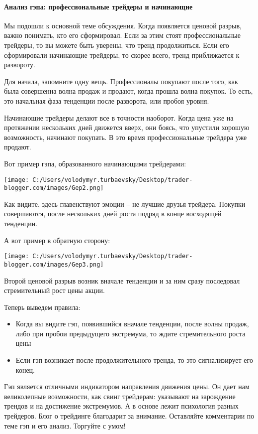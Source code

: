 \documentclass[a5paper]{article}
\begin{document}
\paragraph{Анализ гэпа: профессиональные трейдеры и начинающие}

Мы подошли к основной теме обсуждения. Когда появляется ценовой разрыв, важно понимать, кто его сформировал. Если за этим стоят профессиональные трейдеры, то вы можете быть уверены, что тренд продолжиться. Если его сформировали начинающие трейдеры, то скорее всего, тренд приближается к развороту.

Для начала, запомните одну вещь. Профессионалы покупают после того, как была совершенна волна продаж и продают, когда прошла волна покупок. То есть, это начальная фаза тенденции после разворота, или пробоя уровня.

Начинающие трейдеры делают все в точности наоборот. Когда цена уже на протяжении нескольких дней движется вверх, они боясь, что упустили хорошую возможность, начинают покупать. В это время профессиональные трейдера уже продают.

Вот пример гэпа, образованного начинающими трейдерами:

\texttt{[image: C:/Users/volodymyr.turbaevsky/Desktop/trader-blogger.com/images/Gep2.png]}

Как видите, здесь главенствуют эмоции – не лучшие друзья трейдера. Покупки совершаются, после нескольких дней роста подряд в конце восходящей тенденции.

А вот пример в обратную сторону:

\texttt{[image: C:/Users/volodymyr.turbaevsky/Desktop/trader-blogger.com/images/Gep3.png]}

Второй ценовой разрыв возник вначале тенденции и за ним сразу последовал стремительный рост цены акции.

Теперь выведем правила:
\begin{itemize}
\item     Когда вы видите гэп, появившийся вначале тенденции, после волны продаж, либо при пробои предыдущего экстремума, то ждите стремительного роста цены
\item     Если гэп возникает после продолжительного тренда, то это сигнализирует его конец.
\end{itemize}

Гэп является отличными индикатором направления движения цены. Он дает нам великолепные возможности, как свинг трейдерам: указывают на зарождение трендов и на достижение экстремумов. А в основе лежит психология разных трейдеров. Блог о трейдинге благодарит за внимание. Оставляйте комментарии по теме гэп и его анализ. Торгуйте с умом!
\end{document}
